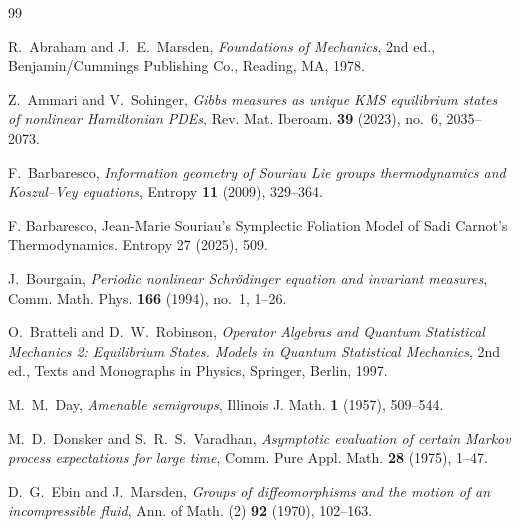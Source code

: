\documentclass[11pt,reqno]{amsart}
\begin{document}
\begin{thebibliography}{99}

R.~Abraham and J.~E.~Marsden,
\emph{Foundations of Mechanics},
2nd ed., Benjamin/Cummings Publishing Co., Reading, MA, 1978.


Z.~Ammari and V.~Sohinger,
\emph{Gibbs measures as unique KMS equilibrium states of nonlinear Hamiltonian PDEs},
Rev. Mat. Iberoam. \textbf{39} (2023), no.~6, 2035--2073.

F.~Barbaresco,
\emph{Information geometry of Souriau Lie groups thermodynamics and Koszul--Vey equations},
Entropy \textbf{11} (2009), 329--364.

F. Barbaresco, Jean-Marie
Souriau’s Symplectic Foliation Model
of Sadi Carnot’s Thermodynamics.
{Entropy} 27 (2025), 509.

J.~Bourgain,
\emph{Periodic nonlinear Schrödinger equation and invariant measures},
Comm. Math. Phys. \textbf{166} (1994), no.~1, 1--26.

O.~Bratteli and D.~W.~Robinson,
\emph{Operator Algebras and Quantum Statistical Mechanics 2: Equilibrium States. Models in Quantum Statistical Mechanics},
2nd ed., Texts and Monographs in Physics,
Springer, Berlin, 1997.

M.~M.~Day,
\emph{Amenable semigroups},
Illinois J. Math. \textbf{1} (1957), 509--544.

M.~D.~Donsker and S.~R.~S.~Varadhan,
\emph{Asymptotic evaluation of certain Markov process expectations for large time},
Comm. Pure Appl. Math. \textbf{28} (1975), 1--47.

D.~G.~Ebin and J.~Marsden,
\emph{Groups of diffeomorphisms and the motion of an incompressible fluid},
Ann. of Math. (2) \textbf{92} (1970), 102--163.




\end{thebibliography}
\end{document}
